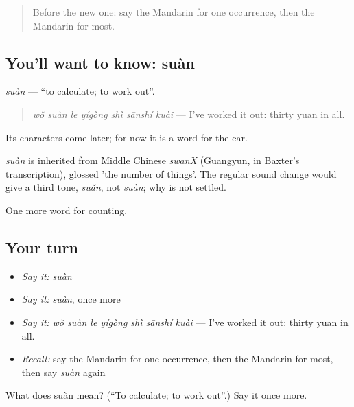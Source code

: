 \label{lesson:ZH-C140-suan}



\begin{quote}
Before the new one: say the Mandarin for one occurrence, then the Mandarin for most.
\end{quote}

\subsection*{You'll want to know: suàn}
\emph{suàn} — \textquotedblleft{}to calculate; to work out\textquotedblright{}.

\begin{quote}
\emph{wǒ suàn le yígòng shì sānshí kuài} — I've worked it out: thirty yuan in all.
\end{quote}

Its characters come later; for now it is a word for the ear.

\begin{cousinweb}
\emph{suàn} is inherited from Middle Chinese \emph{swanX} (Guangyun, in Baxter's transcription), glossed 'the number of things'. The regular sound change would give a third tone, \emph{suǎn}, not \emph{suàn}; why is not settled.
\end{cousinweb}

\begin{grammarlens}[title={What you've built}]
One more word for counting.
\end{grammarlens}

\subsection*{Your turn}
\begin{itemize}
\raggedright
  \item \emph{Say it:} \emph{suàn}
  \item \emph{Say it:} \emph{suàn}, once more
  \item \emph{Say it:} \emph{wǒ suàn le yígòng shì sānshí kuài} — I've worked it out: thirty yuan in all.
  \item \emph{Recall:} say the Mandarin for one occurrence, then the Mandarin for most, then say \emph{suàn} again
\end{itemize}

\begin{tcolorbox}[breakable,colback=teal!4,colframe=teal!35!black,title={Before you move on}]
What does suàn mean? (\textquotedblleft{}To calculate; to work out\textquotedblright{}.) Say it once more.
\end{tcolorbox}
